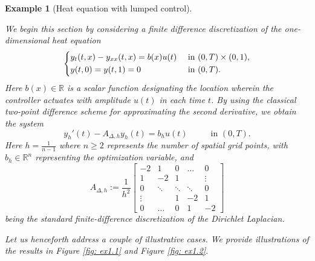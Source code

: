 \documentclass[11pt, a4paper, reqno]{amsart}
\newcommand{\R}{\mathbb{R}}
\theoremstyle{plain}
\numberwithin{equation}{section}
\newtheorem{example}{Example}[section]
\begin{document}
	\begin{example}[Heat equation with lumped control] \label{ex: 1}
	
	We begin this section by considering a finite difference discretization of the one-dimensional heat equation
	\begin{equation*}
	\begin{dcases}
	y_t(t,x) - y_{xx}(t,x) = b(x) u(t) &\text{ in } (0,T)\times (0,1),\\
	y(t,0) = y(t,1) = 0 &\text{ in } (0,T).\\
	\end{dcases}
	\end{equation*}
	Here $b(x)\in\R$ is a scalar function designating the location wherein the controller actuates with amplitude $u(t)$ in each time $t$.
	By using the classical two-point difference scheme for approximating the second derivative, we obtain the system 
	\begin{equation}
	y_h'(t) - A_{\Delta,h}y_h(t) = b_h u(t) \hspace{1cm} \text{ in } (0,T).
	\end{equation}
	Here $h=\frac{1}{n-1}$ where $n\geqslant2$ represents the number of spatial grid points, with $b_h\in \R^n$ representing the optimization variable, and
	\begin{equation*}
	A_{\Delta,h} := 
	\frac{1}{h^2}\begin{bmatrix} 
           -2& 1& 0& \ldots& 0 \\ 
           1& -2& 1& & \vdots \\
           0& \ddots &\ddots& \ddots& 0 \\
           \vdots& & 1 & -2 & 1 \\
           0& \hdots &0 &1 & -2 
    \end{bmatrix}
	\end{equation*}
	being the standard finite-difference discretization of the Dirichlet Laplacian. 
	
	Let us henceforth address a couple of illustrative cases. We provide illustrations of the results in Figure \ref{fig: ex1.1} and Figure \ref{fig: ex1.2}.
	\smallskip
	

\end{example}
\end{document}
